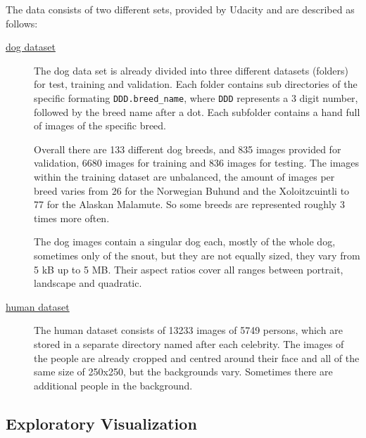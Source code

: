\documentclass[paper=A4, DIV=calc, parskip=half]{scrartcl}
\begin{document}
The data consists of two different sets, provided by Udacity and are described as follows:

\begin{description}
  \item[\href{https://s3-us-west-1.amazonaws.com/udacity-aind/dog-project/dogImages.zip}{dog dataset}]
  The dog data set is already divided into three different datasets (folders)
  for test, training and validation. Each folder contains sub directories of the specific
  formating \texttt{DDD.breed\_name}, where \texttt{DDD} represents a 3 digit number,
  followed by the breed name after a dot. Each subfolder contains a hand full of images of
  the specific breed.
  
  Overall there are 133 different dog breeds, and 835 images provided for validation, 6680
  images for training and 836 images for testing. The images within the training dataset
  are unbalanced, the amount of images per breed varies from 26 for the Norwegian Buhund
  and the Xoloitzcuintli to 77 for the Alaskan Malamute. So some breeds are represented
  roughly 3 times more often.
  
  The dog images contain a singular dog each, mostly of the whole dog, sometimes only of
  the snout, but they are not equally sized, they vary from 5 kB up to 5 MB. Their aspect
  ratios cover all ranges between portrait, landscape and quadratic.
  
  \item[\href{https://s3-us-west-1.amazonaws.com/udacity-aind/dog-project/lfw.zip}{human dataset}]
  The human dataset consists of 13233 images of 5749 persons, which are stored in a
  separate directory named after each  celebrity. The images of the people are already
  cropped and centred around their face and all of the same size of 250x250, but
  the backgrounds vary. Sometimes there are additional people in the background.
\end{description}


\subsection*{Exploratory Visualization}
\end{document}

